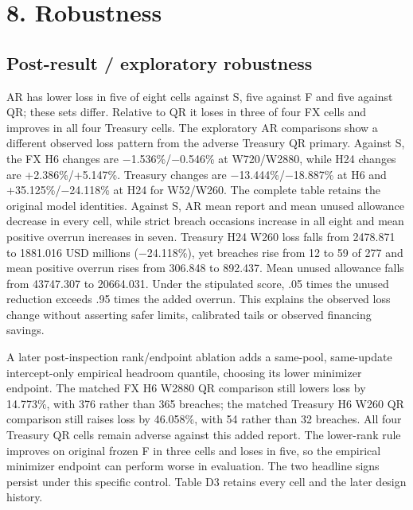 \documentclass[10pt,a4paper]{article}
\begin{document}
\section*{8. Robustness}
\subsection*{Post-result / exploratory robustness}
AR has lower loss in five of eight cells against S, five against F and five against QR; these sets differ. Relative to QR it loses in three of four FX cells and improves in all four Treasury cells. The exploratory AR comparisons show a different observed loss pattern from the adverse Treasury QR primary. Against S, the FX H6 changes are \(-\)1.536\%/\(-\)0.546\% at W720/W2880, while H24 changes are +2.386\%/+5.147\%. Treasury changes are \(-\)13.444\%/\(-\)18.887\% at H6 and +35.125\%/\(-\)24.118\% at H24 for W52/W260. The complete table retains the original model identities. Against S, AR mean report and mean unused allowance decrease in every cell, while strict breach occasions increase in all eight and mean positive overrun increases in seven. Treasury H24 W260 loss falls from 2478.871 to 1881.016 USD millions (\(-\)24.118\%), yet breaches rise from 12 to 59 of 277 and mean positive overrun rises from 306.848 to 892.437. Mean unused allowance falls from 43747.307 to 20664.031. Under the stipulated score, .05 times the unused reduction exceeds .95 times the added overrun. This explains the observed loss change without asserting safer limits, calibrated tails or observed financing savings.

A later post-inspection rank/endpoint ablation adds a same-pool, same-update intercept-only empirical headroom quantile, choosing its lower minimizer endpoint. The matched FX H6 W2880 QR comparison still lowers loss by 14.773\%, with 376 rather than 365 breaches; the matched Treasury H6 W260 QR comparison still raises loss by 46.058\%, with 54 rather than 32 breaches. All four Treasury QR cells remain adverse against this added report. The lower-rank rule improves on original frozen F in three cells and loses in five, so the empirical minimizer endpoint can perform worse in evaluation. The two headline signs persist under this specific control. Table D3 retains every cell and the later design history.
\end{document}
